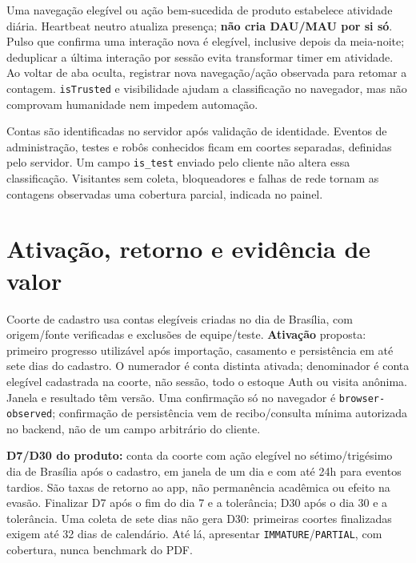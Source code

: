 \documentclass[10pt,a4paper]{article}
\begin{document}
Uma navegação elegível ou ação bem-sucedida de produto estabelece
atividade diária. Heartbeat neutro atualiza presença; \textbf{não cria
DAU/MAU por si só}. Pulso que confirma uma interação nova é elegível,
inclusive depois da meia-noite; deduplicar a última interação por sessão
evita transformar timer em atividade. Ao voltar de aba oculta, registrar
nova navegação/ação observada para retomar a contagem.
{\footnotesize\ttfamily\nolinkurl{isTrusted}} e visibilidade ajudam a classificação no navegador,
mas não comprovam humanidade nem impedem automação.

Contas são identificadas no servidor após validação de identidade.
Eventos de administração, testes e robôs conhecidos ficam em coortes
separadas, definidas pelo servidor. Um campo {\footnotesize\ttfamily\nolinkurl{is_test}} enviado
pelo cliente não altera essa classificação. Visitantes sem coleta,
bloqueadores e falhas de rede tornam as contagens observadas uma
cobertura parcial, indicada no painel.

\clearpage
\section{Ativação, retorno e evidência de
valor}\label{ativauxe7uxe3o-retorno-e-eviduxeancia-de-valor}

Coorte de cadastro usa contas elegíveis criadas no dia de Brasília, com
origem/fonte verificadas e exclusões de equipe/teste. \textbf{Ativação}
proposta: primeiro progresso utilizável após importação, casamento e
persistência em até sete dias do cadastro. O numerador é conta distinta
ativada; denominador é conta elegível cadastrada na coorte, não sessão,
todo o estoque Auth ou visita anônima. Janela e resultado têm versão.
Uma confirmação só no navegador é {\footnotesize\ttfamily\nolinkurl{browser-observed}}; confirmação
de persistência vem de recibo/consulta mínima autorizada no backend, não
de um campo arbitrário do cliente.

\textbf{D7/D30 do produto:} conta da coorte com ação elegível no
sétimo/trigésimo dia de Brasília após o cadastro, em janela de um dia e
com até 24h para eventos tardios. São taxas de retorno ao app, não
permanência acadêmica ou efeito na evasão. Finalizar D7 após o fim do
dia 7 e a tolerância; D30 após o dia 30 e a tolerância. Uma coleta de
sete dias não gera D30: primeiras coortes finalizadas exigem até 32 dias
de calendário. Até lá, apresentar {\footnotesize\ttfamily\nolinkurl{IMMATURE}}/{\footnotesize\ttfamily\nolinkurl{PARTIAL}},
com cobertura, nunca benchmark do PDF.
\end{document}
